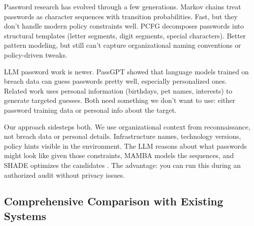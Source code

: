 \documentclass[preprint,12pt]{elsarticle}
\begin{document}
Password research has evolved through a few generations. Markov chains \cite{ma2014} treat passwords as character sequences with transition probabilities. Fast, but they don't handle modern policy constraints well. PCFG \cite{weir2014} decomposes passwords into structural templates (letter segments, digit segments, special characters). Better pattern modeling, but still can't capture organizational naming conventions or policy-driven tweaks.

LLM password work is newer. PassGPT \cite{passgpt2024} showed that language models trained on breach data can guess passwords pretty well, especially personalized ones. Related work \cite{llmpassword2024} uses personal information (birthdays, pet names, interests) to generate targeted guesses. Both need something we don't want to use: either password training data or personal info about the target.

Our approach sidesteps both. We use organizational context from reconnaissance, not breach data or personal details. Infrastructure names, technology versions, policy hints visible in the environment. The LLM reasons about what passwords might look like given those constraints, MAMBA models the sequences, and SHADE optimizes the candidates \cite{gu2023,storn1997,tanabe2013}. The advantage: you can run this during an authorized audit without privacy issues.

\subsection{Comprehensive Comparison with Existing Systems}
\end{document}
